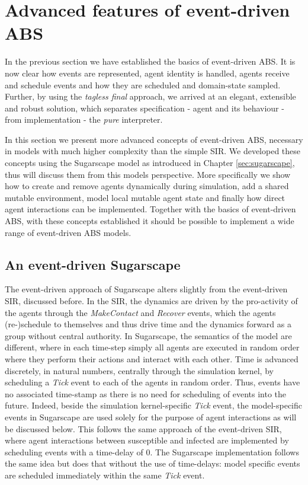 \section{Advanced features of event-driven ABS}
In the previous section we have established the basics of event-driven ABS. It is now clear how events are represented, agent identity is handled, agents receive and schedule events and how they are scheduled and domain-state sampled. Further, by using the \textit{tagless final} approach, we arrived at an elegant, extensible and robust solution, which separates specification - agent and its behaviour - from implementation - the \textit{pure} interpreter. 

In this section we present more advanced concepts of event-driven ABS, necessary in models with much higher complexity than the simple SIR. We developed these concepts using the Sugarscape model as introduced in Chapter \ref{sec:sugarscape}, thus will discuss them from this models perspective. More specifically we show how to create and remove agents dynamically during simulation, add a shared mutable environment, model local mutable agent state and finally how direct agent interactions can be implemented. Together with the basics of event-driven ABS, with these concepts established it should be possible to implement a wide range of event-driven ABS models.

\subsection{An event-driven Sugarscape}
The event-driven approach of Sugarscape alters slightly from the event-driven SIR, discussed before. In the SIR, the dynamics are driven by the pro-activity of the agents through the \textit{MakeContact} and \textit{Recover} events, which the agents (re-)schedule to themselves and thus drive time and the dynamics forward as a group without central authority. In Sugarscape, the semantics of the model are different, where in each time-step simply all agents are executed in random order where they perform their actions and interact with each other. Time is advanced discretely, in natural numbers, centrally through the simulation kernel, by scheduling a \textit{Tick} event to each of the agents in random order. Thus, events have no associated time-stamp as there is no need for scheduling of events into the future. Indeed, beside the simulation kernel-specific \textit{Tick} event, the model-specific events in Sugarscape are used solely for the purpose of agent interactions as will be discussed below. This follows the same approach of the event-driven SIR, where agent interactions between susceptible and infected are implemented by scheduling events with a time-delay of 0. The Sugarscape implementation follows the same idea but does that without the use of time-delays: model specific events are scheduled immediately within the same \textit{Tick} event.

